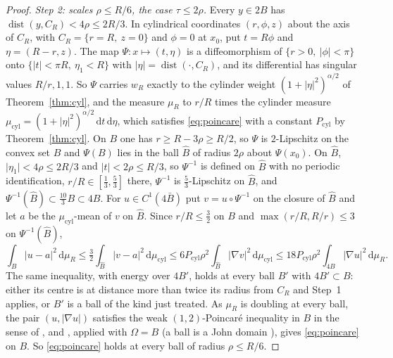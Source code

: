 \documentclass[11pt]{amsart}
\newcommand{\dd}{\,\mathrm{d}}
\newcommand{\abs}[1]{\lvert #1\rvert}
\DeclareMathOperator{\dist}{dist}
\theoremstyle{plain}
\theoremstyle{definition}
\theoremstyle{remark}
\begin{document}
\begin{proof}
\emph{Step 2: scales $\rho\le R/6$, the case $\tau\le2\rho$.} Every $y\in2B$
has $\dist(y,C_R)<4\rho\le2R/3$. In cylindrical coordinates $(r,\phi,z)$ about
the axis of $C_R$, with $C_R=\{r=R,\ z=0\}$ and $\phi=0$ at $x_0$, put
$t=R\phi$ and $\eta=(R-r,z)$. The map $\Psi\colon x\mapsto(t,\eta)$ is a
diffeomorphism of $\{r>0,\ \abs\phi<\pi\}$ onto $\{\abs t<\pi R,\ \eta_1<R\}$
with $\abs\eta=\dist(\cdot,C_R)$, and its differential has singular values
$R/r,1,1$. So $\Psi$ carries $w_R$ exactly to the cylinder weight
$(1+\abs\eta^2)^{\alpha/2}$ of Theorem~\ref{thm:cyl}, and the measure $\mu_R$ to
$r/R$ times the cylinder measure
$\mu_{\mathrm{cyl}}=(1+\abs\eta^2)^{\alpha/2}\dd t\dd\eta$, which satisfies
\eqref{eq:poincare} with a constant $P_{\mathrm{cyl}}$ by
Theorem~\ref{thm:cyl}. On $B$ one has $r\ge R-3\rho\ge R/2$, so $\Psi$ is
$2$-Lipschitz on the convex set $B$ and $\Psi(B)$ lies in the ball $\widehat B$ of
radius $2\rho$ about $\Psi(x_0)$. On $\widehat B$, $\abs{\eta_1}<4\rho\le2R/3$ and
$\abs t<2\rho\le R/3$, so $\Psi^{-1}$ is defined on $\widehat B$ with no periodic
identification, $r/R\in[\tfrac13,\tfrac53]$ there, $\Psi^{-1}$ is
$\tfrac53$-Lipschitz on $\widehat B$, and $\Psi^{-1}(\widehat B)\subset\tfrac{10}3B\subset4B$.
For $u\in C^1(4\bar B)$ put $v=u\circ\Psi^{-1}$ on the closure of $\widehat B$ and let $a$ be the
$\mu_{\mathrm{cyl}}$-mean of $v$ on $\widehat B$. Since $r/R\le\tfrac32$ on $B$ and
$\max(r/R,R/r)\le3$ on $\Psi^{-1}(\widehat B)$,
\[
\int_B\abs{u-a}^2\dd\mu_R\le\tfrac32\int_{\widehat B}\abs{v-a}^2\dd\mu_{\mathrm{cyl}}
\le6P_{\mathrm{cyl}}\rho^2\int_{\widehat B}\abs{\nabla v}^2\dd\mu_{\mathrm{cyl}}
\le18P_{\mathrm{cyl}}\rho^2\int_{4B}\abs{\nabla u}^2\dd\mu_R .
\]
The same inequality, with energy over $4B'$, holds at every ball $B'$ with
$4B'\subset B$: either its centre is at distance more than twice its radius
from $C_R$ and Step~1 applies, or $B'$ is a ball of the kind just
treated. As $\mu_R$ is doubling at every ball, the pair $(u,\abs{\nabla u})$
satisfies the weak $(1,2)$-Poincar\'e inequality in $B$ in the sense of
\cite[(5), p.~7]{hajlaszkoskela2000}, and
\cite[Thm.~9.7]{hajlaszkoskela2000}, applied with $\Omega=B$ (a ball is a John
domain \cite[Cor.~9.5]{hajlaszkoskela2000}), gives \eqref{eq:poincare} on $B$.
So \eqref{eq:poincare} holds at every ball of radius $\rho\le R/6$.


\end{proof}
\end{document}

